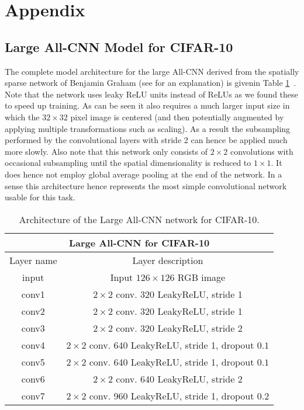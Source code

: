 \documentclass{article} \usepackage{iclr2015,times}
\begin{document}
\section*{Appendix}
\begin{appendix}

\section{Large All-CNN Model for CIFAR-10}
The complete model architecture for the large All-CNN derived from the spatially sparse network of Benjamin Graham (see \citet{Graham2015} for an explanation) is givenin Table \ref{tbl:large_cifar_net}~. Note that the network uses leaky ReLU units instead of ReLUs as we found these to speed up training. As can be seen it also requires a much larger input size in which the $32 \times 32$ pixel image is centered (and then potentially augmented by applying multiple transformations such as scaling). As a result the subsampling performed by the convolutional layers with stride 2 can hence be applied much more slowly. Also note that this network only consists of $2 \times 2$ convolutions with occasional subsampling until the spatial dimensionality is reduced to $1\times 1$. It does hence not employ global average pooling at the end of the network. In a sense this architecture hence represents the most simple convolutional network usable for this task.
\begin{table}[h]
\caption{Architecture of the Large All-CNN network for CIFAR-10.}
\label{tbl:large_cifar_net}
\begin{center}
\begin{tabular}{c|c}
\multicolumn{2}{c}{\textbf{Large All-CNN for CIFAR-10}} \\ \hline
Layer name & Layer description \\ \hline
input & Input $126 \times 126$ RGB image\\
conv1 & $2 \times 2$ conv. 320 LeakyReLU, stride 1\\
conv2 & $2 \times 2$ conv. 320 LeakyReLU, stride 1\\
conv3 & $2 \times 2$ conv. 320 LeakyReLU, stride 2\\
conv4 & $2 \times 2$ conv. 640 LeakyReLU, stride 1, dropout $0.1$\\
conv5 & $2 \times 2$ conv. 640 LeakyReLU, stride 1, dropout $0.1$\\
conv6 & $2 \times 2$ conv. 640 LeakyReLU, stride 2 \\
conv7 & $2 \times 2$ conv. 960 LeakyReLU, stride 1, dropout $0.2$\\

\end{tabular}
\end{center}
\end{table}
\end{appendix}
\end{document}
